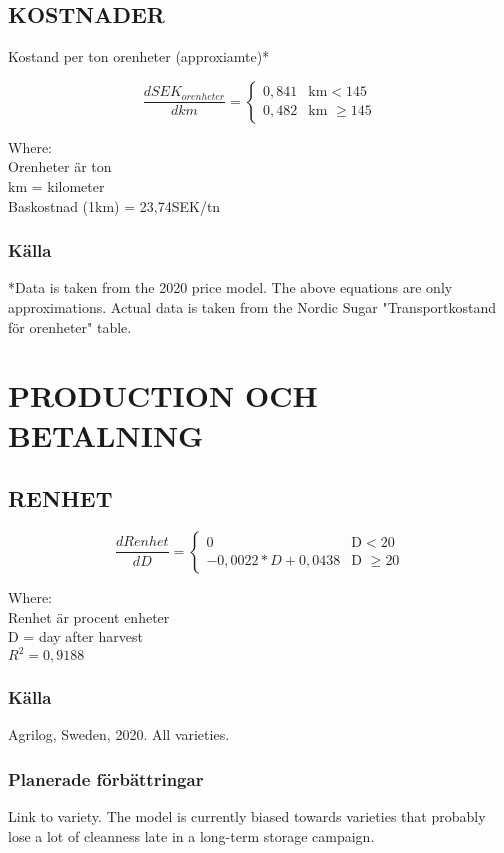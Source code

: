 \documentclass[fleqn]{article}
\begin{document}
  \subsection{KOSTNADER}
  
  Kostand per ton orenheter (approxiamte)*
  
  \begin{equation}
    \frac{dSEK_{orenheter}}{dkm} =
    \begin{cases}
      0,841 & \text{km} < 145\\
      0,482 & \text{km $\geq 145$}
    \end{cases}
  \end{equation}

  Where:\\
  \hangindent=1.5cm
  Orenheter är ton\\
  km = kilometer\\
  Baskostnad (1km) = 23,74SEK/tn
  
  \subsubsection{Källa}
  *Data is taken from the 2020 price model. The above equations are only approximations. 
  Actual data is taken from the Nordic Sugar "Transportkostand för orenheter" table. 


\pagebreak
\section{PRODUCTION OCH BETALNING}

  \subsection{RENHET}

  \begin{equation}
    \frac{dRenhet}{dD} =
    \begin{cases}
      0 & \text{D} < 20\\
      -0,0022*D + 0,0438 & \text{D $\geq 20$}
    \end{cases}
  \end{equation}

  Where:\\
  \hangindent=1.5cm
  Renhet är procent enheter\\
  D = day after harvest\\
  $R^2 = 0,9188$

    \subsubsection{Källa}
    Agrilog, Sweden, 2020. All varieties.
    
    \subsubsection{Planerade förbättringar}
    Link to variety. The model is currently biased towards varieties that probably lose a lot of cleanness late in a long-term storage campaign.

\end{document}
